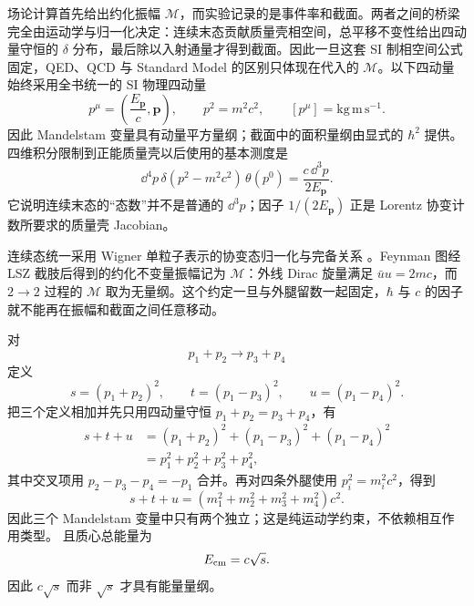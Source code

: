 
场论计算首先给出约化振幅 $\mathcal M$，而实验记录的是事件率和截面。两者之间的桥梁完全由运动学与归一化决定：连续末态贡献质量壳相空间，总平移不变性给出四动量守恒的 $\delta$ 分布，最后除以入射通量才得到截面。因此一旦这套 SI 制相空间公式固定，QED、QCD 与 Standard Model 的区别只体现在代入的 $\mathcal M$。以下四动量始终采用全书统一的 SI 物理四动量
\begin{equation}
 p^\mu=\left(\frac{E_{\mathbf p}}{c},\mathbf p\right),
 \qquad
 p^2=m^2c^2,
 \qquad
 [p^\mu]=\mathrm{kg\,m\,s^{-1}}.
 \label{eq:si-scattering-fourmomentum-r9}
\end{equation}
因此 Mandelstam 变量具有动量平方量纲；截面中的面积量纲由显式的 \(\hbar^2\) 提供。四维积分限制到正能质量壳以后使用的基本测度是
\begin{equation}
 \boxed{
 \dd^4 p\,\delta(p^2-m^2c^2)\,\theta(p^0)
 =\frac{c\,\dd^3 p}{2E_{\mathbf p}}.}
 \label{eq:positive-energy-mass-shell-measure-r68}
\end{equation}
它说明连续末态的“态数”并不是普通的 \(\dd^3 p\)；因子 \(1/(2E_{\mathbf p})\) 正是 Lorentz 协变计数所要求的质量壳 Jacobian。

连续态统一采用 Wigner 单粒子表示的协变态归一化与完备关系 。Feynman 图经 LSZ 截肢后得到的约化不变量振幅记为 \(\mathcal M\)：外线 Dirac 旋量满足 \(\bar uu=2mc\)，而 \(2\to2\) 过程的 \(\mathcal M\) 取为无量纲。这个约定一旦与外腿留数一起固定，\(\hbar\) 与 \(c\) 的因子就不能再在振幅和截面之间任意移动。

对
\begin{equation*}
 p_1+p_2\longrightarrow p_3+p_4
\end{equation*}
定义
\begin{equation}
 \boxed{
 s=(p_1+p_2)^2,
 \qquad
 t=(p_1-p_3)^2,
 \qquad
 u=(p_1-p_4)^2.}
 \label{eq:mandelstam-def-si-r9}
\end{equation}
把三个定义相加并先只用四动量守恒 $p_1+p_2=p_3+p_4$，有
\begin{align*}
s+t+u
&=(p_1+p_2)^2+(p_1-p_3)^2+(p_1-p_4)^2\\
&=p_1^2+p_2^2+p_3^2+p_4^2,
\end{align*}
其中交叉项用 $p_2-p_3-p_4=-p_1$ 合并。再对四条外腿使用 $p_i^2=m_i^2c^2$，得到
\begin{equation}
 \boxed{
 s+t+u=(m_1^2+m_2^2+m_3^2+m_4^2)c^2.}
 \label{eq:stu-sum-si-r9}
\end{equation}
因此三个 Mandelstam 变量中只有两个独立；这是纯运动学约束，不依赖相互作用类型。
且质心总能量为
\begin{equation}
 E_{\rm cm}=c\sqrt{s}.
 \label{eq:Ecm-s-si-r9}
\end{equation}
因此 \(c\sqrt s\) 而非 \(\sqrt s\) 才具有能量量纲。


